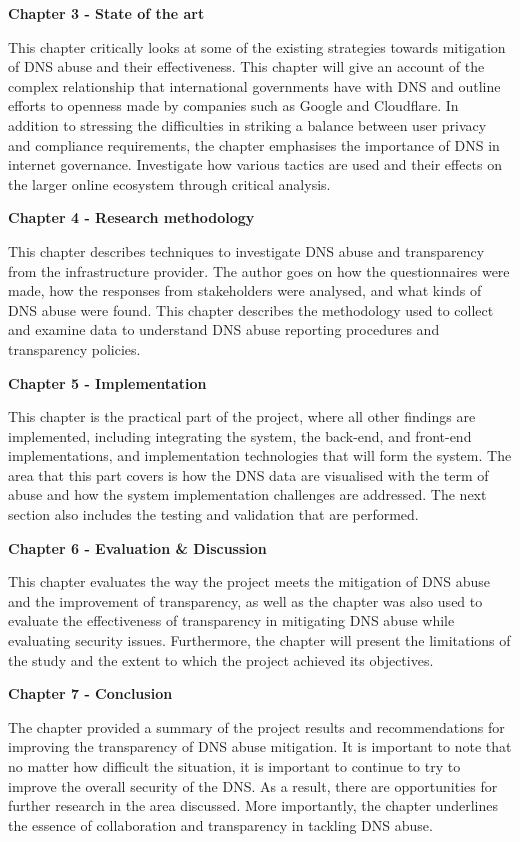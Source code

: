 \textbf{Chapter 3 -  State of the art }

This chapter critically looks at some of the existing strategies towards mitigation of DNS abuse and their effectiveness. This chapter will give an account of the complex relationship that international governments have with DNS and outline efforts to openness made by companies such as Google and Cloudflare. In addition to stressing the difficulties in striking a balance between user privacy and compliance requirements, the chapter emphasises the importance of DNS in internet governance. Investigate how various tactics are used and their effects on the larger online ecosystem through critical analysis.

\textbf{Chapter 4 -  Research methodology }

This chapter describes techniques to investigate DNS abuse and transparency from the infrastructure provider. The author goes on how the questionnaires were made, how the responses from stakeholders were analysed, and what kinds of DNS abuse were found. This chapter describes the methodology used to collect and examine data to understand DNS abuse reporting procedures and transparency policies.

\textbf{Chapter 5 -  Implementation }

This chapter is the practical part of the project, where all other findings are implemented, including integrating the system, the back-end, and front-end implementations, and implementation technologies that will form the system. The area that this part covers is how the DNS data are visualised with the term of abuse and how the system implementation challenges are addressed. The next section also includes the testing and validation that are performed.

\textbf{Chapter 6 -  Evaluation \& Discussion }

This chapter evaluates the way the project meets the mitigation of DNS abuse and the improvement of transparency, as well as the chapter was also used to evaluate the effectiveness of transparency in mitigating DNS abuse while evaluating security issues. Furthermore, the chapter will present the limitations of the study and the extent to which the project achieved its objectives.

\textbf{Chapter 7 -  Conclusion }

The chapter provided a summary of the project results and recommendations for improving the transparency of DNS abuse mitigation. It is important to note that no matter how difficult the situation, it is important to continue to try to improve the overall security of the DNS. As a result, there are opportunities for further research in the area discussed. More importantly, the chapter underlines the essence of collaboration and transparency in tackling DNS abuse.
